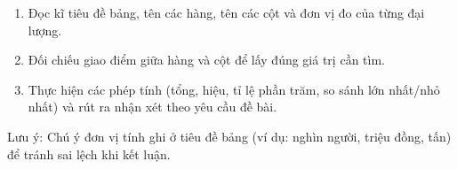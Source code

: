 \begin{enumerate}
\item Đọc kĩ tiêu đề bảng, tên các hàng, tên các cột và đơn vị đo của từng đại lượng.
\item Đối chiếu giao điểm giữa hàng và cột để lấy đúng giá trị cần tìm.
\item Thực hiện các phép tính (tổng, hiệu, tỉ lệ phần trăm, so sánh lớn nhất/nhỏ nhất) và rút ra nhận xét theo yêu cầu đề bài.
\end{enumerate}
Lưu ý: Chú ý đơn vị tính ghi ở tiêu đề bảng (ví dụ: nghìn người, triệu đồng, tấn) để tránh sai lệch khi kết luận.
